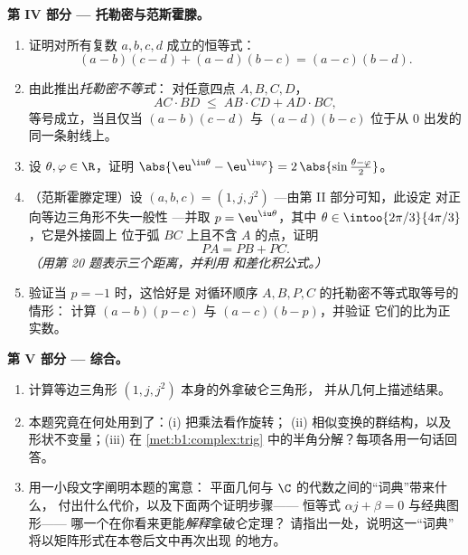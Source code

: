 \begin{problem}
\medskip
\noindent\textbf{第 IV 部分 --- 托勒密与范斯霍滕。}
\begin{enumerate}[resume]
  \item 证明对所有复数 $a, b, c, d$ 成立的恒等式：
        \[
        (a - b)(c - d) + (a - d)(b - c) = (a - c)(b - d) .
        \]
  \item 由此推出\emph{托勒密不等式}：
        对任意四点 $A, B, C, D$，
        \[
        AC \cdot BD \;\leq\; AB \cdot CD + AD \cdot BC ,
        \]
        等号成立，当且仅当 $(a-b)(c-d)$ 与
        $(a-d)(b-c)$ 位于从 $0$ 出发的同一条射线上。
  \item 设 $\theta, \varphi \in \R$，证明
        $\abs{\eu^{\iu\theta} - \eu^{\iu\varphi}} =
        2\,\abs{\sin\frac{\theta - \varphi}2}$。
  \item （范斯霍滕定理）设
        $(a, b, c) = (1, j, j^2)$ ---由第 II 部分可知，此设定
        对正向等边三角形不失一般性 ---并取
        $p = \eu^{\iu\theta}$，其中 $\theta \in
        \intoo{2\pi/3}{4\pi/3}$，它是外接圆上
        位于弧 $BC$ 上且不含 $A$ 的点，证明
        \[
        PA = PB + PC .
        \]
        \emph{（用第 20 题表示三个距离，并利用
        和差化积公式。）}
  \item 验证当 $p = -1$ 时，这恰好是
        对循环顺序 $A, B, P, C$ 的托勒密不等式取等号的情形：
        计算 $(a - b)(p - c)$ 与 $(a - c)(b - p)$，并验证
        它们的比为正实数。
\end{enumerate}

\medskip
\noindent\textbf{第 V 部分 --- 综合。}
\begin{enumerate}[resume]
  \item 计算等边三角形
        $(1, j, j^2)$ 本身的外拿破仑三角形，
        并从几何上描述结果。
  \item 本题究竟在何处用到了：(i) 把乘法看作旋转；
        (ii) 相似变换的群结构，以及
        形状不变量；(iii) 在
        \cref{met:b1:complex:trig} 中的半角分解？每项各用一句话回答。
  \item 用一小段文字阐明本题的寓意：
        平面几何与 $\C$ 的代数之间的“词典”带来什么，
        付出什么代价，以及下面两个证明步骤——
        恒等式 $\alpha j + \beta = 0$ 与经典图形——
        哪一个在你看来更能\emph{解释}拿破仑定理？
        请指出一处，说明这一“词典”
        将以矩阵形式在本卷后文中再次出现
        的地方。
\end{enumerate}
\end{problem}
